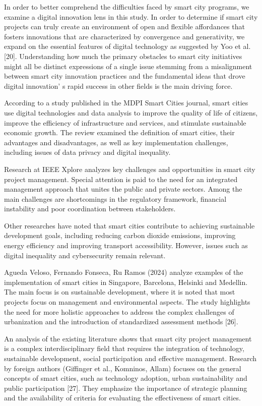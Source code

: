 In order to better comprehend the difficulties faced by smart city
programs, we examine a digital innovation lens in this study. In order
to determine if smart city projects can truly create an environment of
open and flexible affordances that fosters innovations that are
characterized by convergence and generativity, we expand on the
essential features of digital technology as suggested by Yoo et al.
{[}20{]}. Understanding how much the primary obstacles to smart city
initiatives might all be distinct expressions of a single issue stemming
from a misalignment between smart city innovation practices and the
fundamental ideas that drove digital innovation' s rapid
success in other fields is the main driving force.

According to a study published in the MDPI Smart Cities journal, smart
cities use digital technologies and data analysis to improve the quality
of life of citizens, improve the efficiency of infrastructure and
services, and stimulate sustainable economic growth. The review examined
the definition of smart cities, their advantages and disadvantages, as
well as key implementation challenges, including issues of data privacy
and digital inequality.

Research at IEEE Xplore analyzes key challenges and opportunities in
smart city project management. Special attention is paid to the need for
an integrated management approach that unites the public and private
sectors. Among the main challenges are shortcomings in the regulatory
framework, financial instability and poor coordination between
stakeholders.

Other researches have noted that smart cities contribute to achieving
sustainable development goals, including reducing carbon dioxide
emissions, improving energy efficiency and improving transport
accessibility. However, issues such as digital inequality and
cybersecurity remain relevant.

Agueda Veloso, Fernando Fonseca, Ru Ramos (2024) analyze examples of the
implementation of smart cities in Singapore, Barcelona, Helsinki and
Medellin. The main focus is on sustainable development, where it is
noted that most projects focus on management and environmental aspects.
The study highlights the need for more holistic approaches to address
the complex challenges of urbanization and the introduction of
standardized assessment methods {[}26{]}.

An analysis of the existing literature shows that smart city project
management is a complex interdisciplinary field that requires the
integration of technology, sustainable development, social participation
and effective management. Research by foreign authors (Giffinger et al.,
Komninos, Allam) focuses on the general concepts of smart cities, such
as technology adoption, urban sustainability and public participation
{[}27{]}. They emphasize the importance of strategic planning and the
availability of criteria for evaluating the effectiveness of smart
cities.

